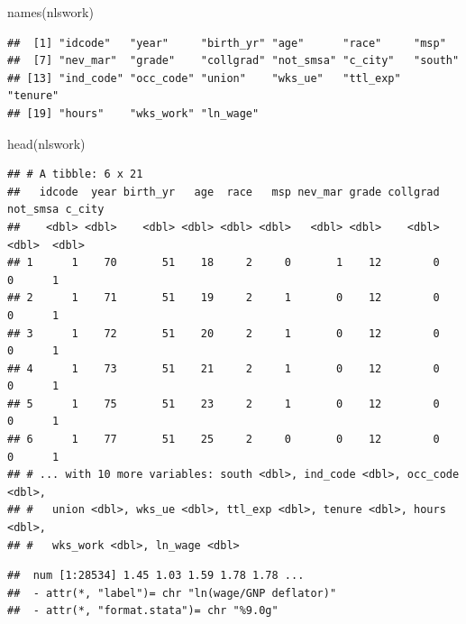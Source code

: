 \documentclass[
]{article}
\newenvironment{Shaded}{\begin{snugshade}}{\end{snugshade}}
\newcommand{\CommentTok}[1]{\textcolor[rgb]{0.56,0.35,0.01}{\textit{#1}}}
\newcommand{\FunctionTok}[1]{\textcolor[rgb]{0.00,0.00,0.00}{#1}}
\newcommand{\NormalTok}[1]{#1}
\newcommand{\SpecialCharTok}[1]{\textcolor[rgb]{0.00,0.00,0.00}{#1}}
\begin{document}
\begin{Shaded}
\begin{Highlighting}[]
  \FunctionTok{names}\NormalTok{(nlswork)}
\end{Highlighting}
\end{Shaded}

\begin{verbatim}
##  [1] "idcode"   "year"     "birth_yr" "age"      "race"     "msp"     
##  [7] "nev_mar"  "grade"    "collgrad" "not_smsa" "c_city"   "south"   
## [13] "ind_code" "occ_code" "union"    "wks_ue"   "ttl_exp"  "tenure"  
## [19] "hours"    "wks_work" "ln_wage"
\end{verbatim}

\begin{Shaded}
\begin{Highlighting}[]
  \FunctionTok{head}\NormalTok{(nlswork)}
\end{Highlighting}
\end{Shaded}

\begin{verbatim}
## # A tibble: 6 x 21
##   idcode  year birth_yr   age  race   msp nev_mar grade collgrad not_smsa c_city
##    <dbl> <dbl>    <dbl> <dbl> <dbl> <dbl>   <dbl> <dbl>    <dbl>    <dbl>  <dbl>
## 1      1    70       51    18     2     0       1    12        0        0      1
## 2      1    71       51    19     2     1       0    12        0        0      1
## 3      1    72       51    20     2     1       0    12        0        0      1
## 4      1    73       51    21     2     1       0    12        0        0      1
## 5      1    75       51    23     2     1       0    12        0        0      1
## 6      1    77       51    25     2     0       0    12        0        0      1
## # ... with 10 more variables: south <dbl>, ind_code <dbl>, occ_code <dbl>,
## #   union <dbl>, wks_ue <dbl>, ttl_exp <dbl>, tenure <dbl>, hours <dbl>,
## #   wks_work <dbl>, ln_wage <dbl>
\end{verbatim}

\begin{Shaded}
\end{Shaded}

\begin{verbatim}
##  num [1:28534] 1.45 1.03 1.59 1.78 1.78 ...
##  - attr(*, "label")= chr "ln(wage/GNP deflator)"
##  - attr(*, "format.stata")= chr "%9.0g"
\end{verbatim}
\end{document}
